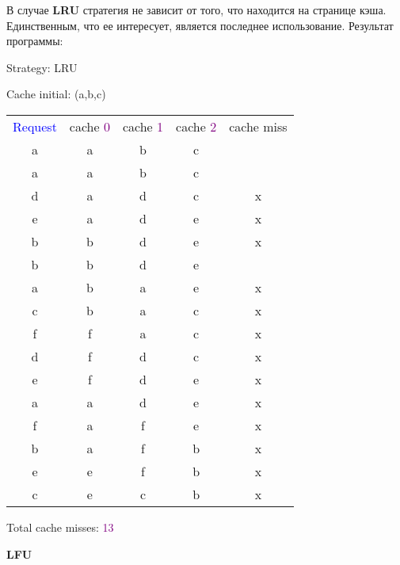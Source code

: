 В случае \textbf{LRU} стратегия не зависит от того, что находится на странице кэша. Единственным, что ее интересует, является последнее использование. Результат программы:

\newpage

\begin{tcolorbox}
{
Strategy: LRU

\vspace{\baselineskip}

Cache initial: (a,b,c)

\vspace{\baselineskip}
\begin{tabular}{*{5}{c}}
\textcolor{Blue}{Request} & cache \textcolor{Purple}{0} & cache \textcolor{Purple}{1} & cache \textcolor{Purple}{2} & cache miss \\
a & a & b & c & \ \\
a & a & b & c & \ \\
d & a & d & c & x \\
e & a & d & e & x \\
b & b & d & e & x \\
b & b & d & e & \ \\
a & b & a & e & x \\
c & b & a & c & x \\
f & f & a & c & x \\
d & f & d & c & x \\
e & f & d & e & x \\
a & a & d & e & x \\
f & a & f & e & x \\
b & a & f & b & x \\
e & e & f & b & x \\
c & e & c & b & x \\
\end{tabular}

\vspace{\baselineskip}

Total cache misses: \textcolor{Purple}{13}}
\end{tcolorbox}

\textbf{LFU}

